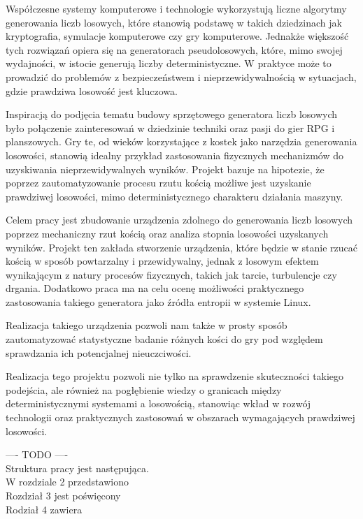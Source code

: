 Współczesne systemy komputerowe i technologie wykorzystują liczne algorytmy generowania liczb losowych, które stanowią podstawę w takich dziedzinach jak kryptografia,
symulacje komputerowe czy gry komputerowe.
Jednakże większość tych rozwiązań opiera się na generatorach pseudolosowych,
które, mimo swojej wydajności, w istocie generują liczby deterministyczne.
W praktyce może to prowadzić do problemów z bezpieczeństwem i nieprzewidywalnością w sytuacjach, gdzie prawdziwa losowość jest kluczowa.

Inspiracją do podjęcia tematu budowy sprzętowego generatora liczb losowych było połączenie zainteresowań w dziedzinie techniki oraz pasji do gier RPG i planszowych.
Gry te, od wieków korzystające z kostek jako narzędzia generowania losowości, stanowią idealny przykład zastosowania fizycznych mechanizmów do uzyskiwania nieprzewidywalnych wyników.
Projekt bazuje na hipotezie, że poprzez zautomatyzowanie procesu rzutu kością możliwe jest uzyskanie prawdziwej losowości, mimo deterministycznego charakteru działania maszyny.

Celem pracy jest zbudowanie urządzenia zdolnego do generowania liczb losowych poprzez mechaniczny rzut kością oraz analiza stopnia losowości uzyskanych wyników.
Projekt ten zakłada stworzenie urządzenia, które będzie w stanie rzucać kością w sposób powtarzalny i przewidywalny,
jednak z losowym efektem wynikającym z natury procesów fizycznych, takich jak tarcie, turbulencje czy drgania.
Dodatkowo praca ma na celu ocenę możliwości praktycznego zastosowania takiego generatora jako źródła entropii w systemie Linux.

Realizacja takiego urządzenia pozwoli nam także w prosty sposób zautomatyzować statystyczne badanie różnych kości do gry pod względem sprawdzania ich potencjalnej nieuczciwości.

Realizacja tego projektu pozwoli nie tylko na sprawdzenie skuteczności takiego podejścia,
ale również na pogłębienie wiedzy o granicach między deterministycznymi systemami a losowością,
stanowiąc wkład w rozwój technologii oraz praktycznych zastosowań w obszarach wymagających prawdziwej losowości.


---- TODO ---- \\
Struktura pracy jest następująca. \\
W rozdziale 2 przedstawiono \\
Rozdział 3 jest poświęcony \\
Rodział 4 zawiera \\


